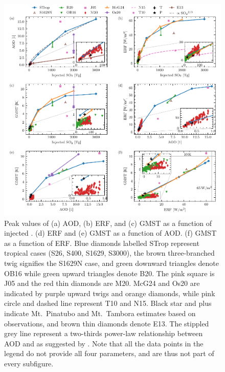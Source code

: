 \documentclass[draft]{agujournal2019}
\begin{document}
  \begin{figure}
    \centering \includegraphics[width=1\linewidth]{figure4}

    \caption{Peak values of (a) AOD, (b) ERF, and (c) GMST as a function of injected
      \@. (d) ERF and (e) GMST as a function of AOD. (f) GMST as a function of
      ERF. Blue diamonds labelled STrop represent tropical cases (S26, S400, S1629,
      S3000), the brown three-branched twig signifies the S1629N case, and green
      downward triangles denote OB16 while green upward triangles denote B20. The pink
      square is J05 and the red thin diamonds are M20. McG24 and Os20 are indicated by
      purple upward twigs and orange diamonds, while pink circle and dashed line
      represent T10 and N15. Black star and plus indicate Mt.\ Pinatubo and Mt.\ Tambora
      estimates based on observations, and brown thin diamonds denote E13. The stippled
      grey line represent a two-thirds power-law relationship between AOD and 
      as suggested by . Note that all the data points in the legend
      do not provide all four parameters, and are thus not part of every
      subfigure.}\label{fig:4_parameter_scan}%
  \end{figure}
\end{document}
